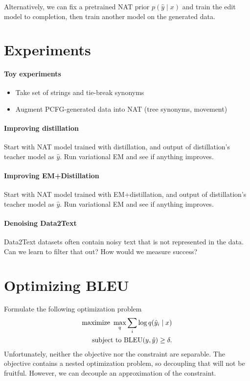 \documentclass[11pt]{article}
\begin{document}
Alternatively, we can fix a pretrained NAT prior $p(\hat{y}\mid x)$ and
train the edit model to completion, then train another model on the generated data.

\section{Experiments}
\paragraph{Toy experiments}
\begin{itemize}
\item Take set of strings and tie-break synonyms
\item Augment PCFG-generated data into NAT (tree synonyms, movement)
\end{itemize}

\paragraph{Improving distillation}
Start with NAT model trained with distillation,
and output of distillation's teacher model as $\hat{y}$.
Run variational EM and see if anything improves.

\paragraph{Improving EM+Distillation}
Start with NAT model trained with EM+distillation,
and output of distillation's teacher model as $\hat{y}$.
Run variational EM and see if anything improves.

\paragraph{Denoising Data2Text}
Data2Text datasets often contain noisy text that is not represented in the data.
Can we learn to filter that out?
How would we measure success?

\section{Optimizing BLEU}
Formulate the following optimization problem
\begin{equation}
\begin{aligned}
\textnormal{maximize } \max_q \sum_i \log q(\hat{y}_i \mid x) \\
\textnormal{subject to } \textnormal{BLEU}(y, \hat{y}) \geq \delta.
\end{aligned}
\end{equation}
Unfortunately, neither the objective nor the constraint are separable.
The objective contains a nested optimization problem, so decoupling that will not be fruitful.
However, we can decouple an approximation of the constraint.
\end{document}

